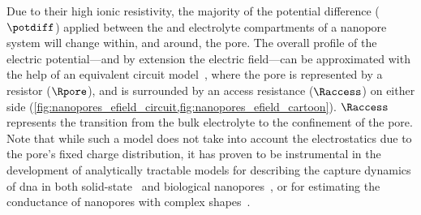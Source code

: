 Due to their high ionic resistivity, the majority of the potential difference ($\potdiff$) applied between the
\cisi{} and \transi{} electrolyte compartments of a nanopore system will change within, and around, the pore.
The overall profile of the electric potential---and by extension the electric field---can be approximated
with the help of an equivalent circuit model~\cite{Wanunu-2009,Grosberg-2010,Kowalczyk-2011}, where the pore
is represented by a resistor ($\Rpore$), and is surrounded by an access resistance ($\Raccess$) on either side
(\cref{fig:nanopores_efield_circuit,fig:nanopores_efield_cartoon}). $\Raccess$ represents the transition from
the bulk electrolyte to the confinement of the pore. Note that while such a model does not take into account
the electrostatics due to the pore's fixed charge distribution, it has proven to be instrumental in the
development of analytically tractable models for describing the capture dynamics of \gls{dna} in both
solid-state~\cite{Wanunu-2009,Grosberg-2010,Muthukumar-2010} and biological
nanopores~\cite{Chinappi-2015,Nomidis-2018}, or for estimating the conductance of nanopores with complex
shapes~\cite{Wanunu-2009,Kowalczyk-2011}.

